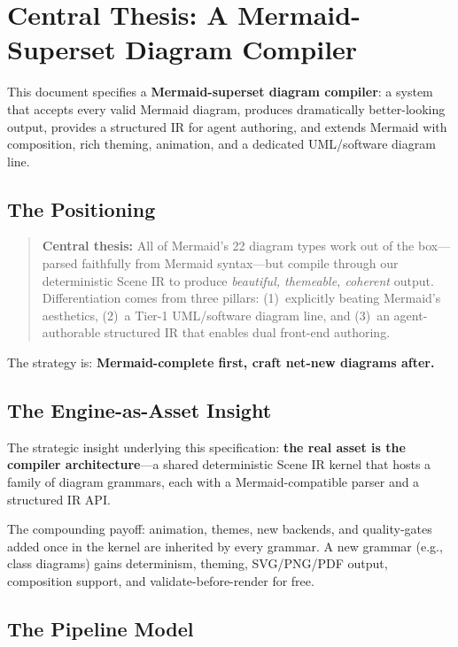 \section{Central Thesis: A Mermaid-Superset Diagram Compiler}
\label{sec:central-thesis}

This document specifies a \textbf{Mermaid-superset diagram compiler}: a system that accepts
every valid Mermaid diagram, produces dramatically better-looking output, provides a
structured IR for agent authoring, and extends Mermaid with composition, rich theming,
animation, and a dedicated UML/software diagram line.

\subsection{The Positioning}

\begin{quote}
\textbf{Central thesis:} All of Mermaid's 22 diagram types work out of the box---parsed
faithfully from Mermaid syntax---but compile through our deterministic Scene IR to produce
\emph{beautiful, themeable, coherent} output. Differentiation comes from three pillars:
(1)~explicitly beating Mermaid's aesthetics, (2)~a Tier-1 UML/software diagram line,
and (3)~an agent-authorable structured IR that enables dual front-end authoring.
\end{quote}

The strategy is: \textbf{Mermaid-complete first, craft net-new diagrams after.}

\subsection{The Engine-as-Asset Insight}

The strategic insight underlying this specification: \textbf{the real asset is the compiler
architecture}---a shared deterministic Scene IR kernel that hosts a family of diagram
grammars, each with a Mermaid-compatible parser and a structured IR API.

The compounding payoff: animation, themes, new backends, and quality-gates added once in
the kernel are inherited by every grammar. A new grammar (e.g., class diagrams) gains
determinism, theming, SVG/PNG/PDF output, composition support, and validate-before-render
for free.

\subsection{The Pipeline Model}

